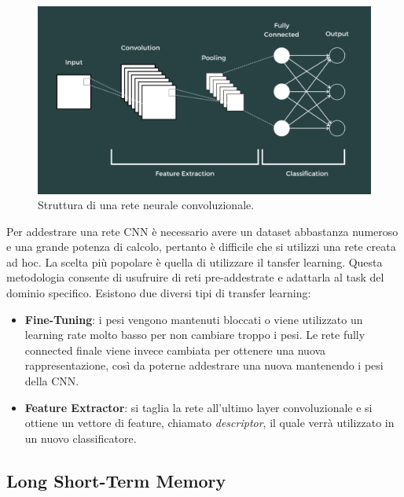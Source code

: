 \documentclass[11pt]{report}
\begin{document}
\begin{figure}[h]
    \centering
    \includegraphics[scale = 0.3]{img/cnn.png}
    \caption[Struttura di una rete neurale convoluzionale.]{Struttura di una rete neurale convoluzionale.\footnotemark}
    \label{fig:cnn}
\end{figure}




Per addestrare una rete CNN è necessario avere un dataset abbastanza numeroso e una grande potenza di calcolo, pertanto è difficile che si utilizzi una rete creata ad hoc. La scelta più popolare è quella di utilizzare il tansfer learning. Questa metodologia consente di usufruire di reti pre-addestrate e adattarla al task del dominio specifico. Esistono due diversi tipi di transfer learning:
\begin{itemize}
    \item \textbf{Fine-Tuning}: i pesi vengono mantenuti bloccati o viene utilizzato un learning rate molto basso per non cambiare troppo i pesi. Le rete fully connected finale viene invece cambiata per ottenere una nuova rappresentazione, così da poterne addestrare una nuova mantenendo i pesi della CNN. 
    

    \item \textbf{Feature Extractor}: si taglia la rete all'ultimo layer convoluzionale e si ottiene un vettore di feature, chiamato \textit{descriptor}, il quale verrà utilizzato in un nuovo classificatore.

\end{itemize}

\subsection{Long Short-Term Memory}
\end{document}
